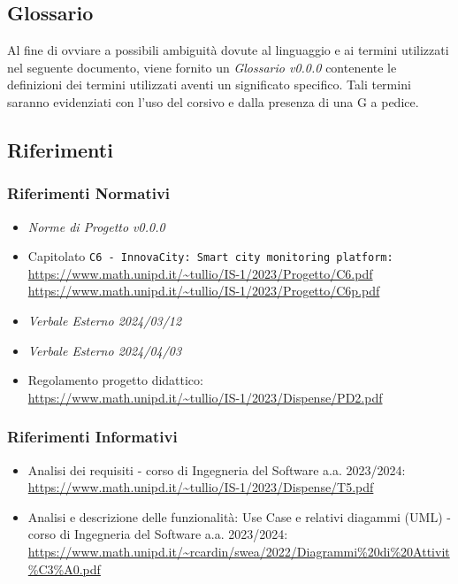 \documentclass[8pt]{article}
\begin{document}
\subsection{Glossario}
Al fine di ovviare a possibili ambiguità dovute al linguaggio e ai termini utilizzati nel seguente documento, viene fornito un \textit{Glossario v0.0.0} contenente le definizioni dei termini utilizzati aventi un significato specifico. Tali termini saranno evidenziati con l'uso del corsivo e dalla presenza di una G a pedice.
\subsection{Riferimenti}
\subsubsection{Riferimenti Normativi}
\begin{itemize}
	\setlength\itemsep{0em}
	\item \textit{Norme di Progetto v0.0.0}
	\item Capitolato \texttt{C6 - InnovaCity: Smart city monitoring platform:} \\ \url{https://www.math.unipd.it/~tullio/IS-1/2023/Progetto/C6.pdf} \\ \url{https://www.math.unipd.it/~tullio/IS-1/2023/Progetto/C6p.pdf}
	\item \textit{Verbale Esterno 2024/03/12}
	\item \textit{Verbale Esterno 2024/04/03}
	\item Regolamento progetto didattico: \\ \url{https://www.math.unipd.it/~tullio/IS-1/2023/Dispense/PD2.pdf}
\end{itemize}
\subsubsection{Riferimenti Informativi}
\begin{itemize}
	\setlength\itemsep{0em}
	\item Analisi dei requisiti - corso di Ingegneria del Software a.a. 2023/2024: \\ \url{https://www.math.unipd.it/~tullio/IS-1/2023/Dispense/T5.pdf}
    \item Analisi e descrizione delle funzionalità: Use Case e relativi diagammi (UML) - corso di Ingegneria del Software a.a. 2023/2024: \\ \url{https://www.math.unipd.it/~rcardin/swea/2022/Diagrammi%20di%20Attivit%C3%A0.pdf}
\end{itemize}
\newpage
\end{document}
